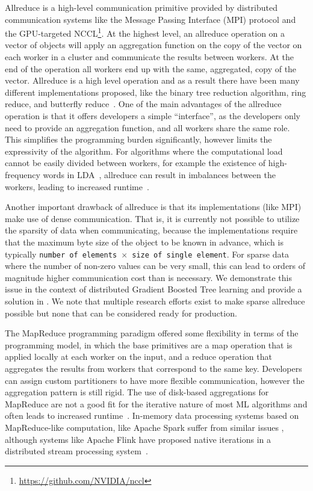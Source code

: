 Allreduce is a high-level communication primitive provided by distributed communication
systems like the Message Passing Interface (MPI) protocol \cite{mpi} and the
GPU-targeted NCCL\footnote{\url{https://github.com/NVIDIA/nccl}}. At the highest
level, an allreduce operation on a vector of objects will apply an aggregation
function on the copy of the vector on each worker in a cluster and communicate
the results between workers. At the end of the operation all workers end up with the same,
aggregated, copy of the vector. Allreduce is a high level operation and as a result there have been
many different implementations proposed, like the
binary tree reduction algorithm, ring reduce, and butterfly reduce~\cite{allreduce}.
One of the main advantages of the allreduce operation is that it offers developers a simple ``interface'', as the developers only need to provide an aggregation function,
and all workers share the same role.
This simplifies the programming burden significantly, however limits the expressivity
of the algorithm. For algorithms where the computational load cannot be easily divided between
workers, for example the existence of high-frequency words in LDA~\cite{lightLDA}, allreduce can result
in imbalances between the workers, leading to increased runtime~\cite{straggler-ml, stale-sync-ps}.

Another important drawback of allreduce is that its implementations (like MPI) make use of dense communication. That is, it is currently
not possible to utilize the sparsity of data when communicating, because the implementations
require that the maximum byte size of the object to be known in advance, which is
typically \texttt{number of elements $\times$ size of single element}. For sparse
data where the number of non-zero values can be very small, this can lead to orders
of magnitude higher communication cost than is necessary. We demonstrate this issue in the context
of distributed Gradient Boosted Tree learning and provide
a solution in \blockgbt. We note that multiple research
efforts exist to make sparse allreduce possible \cite{sparse-comms-ml, sparse-allreduce, sparse-mpi}
but none that can be considered ready for production.


The MapReduce programming paradigm \cite{mapreduce} offered some flexibility in terms of the
programming model, in which the base primitives are a map operation that is applied
locally at each worker on the input, and a reduce operation that aggregates the results
from workers that correspond to the same key. Developers can assign custom partitioners
to have more flexible communication, however the aggregation pattern is still rigid.
The use of disk-based aggregations for MapReduce are not a good fit for the iterative
nature of most ML algorithms and often leads to increased runtime~\cite{slow-learners-fast}.
In-memory data processing systems based on MapReduce-like computation, like Apache Spark \cite{spark}
suffer from similar issues \cite{scalability-cost}, although systems like Apache Flink have proposed native iterations
in a distributed stream processing system~\cite{flink-iterations}.

